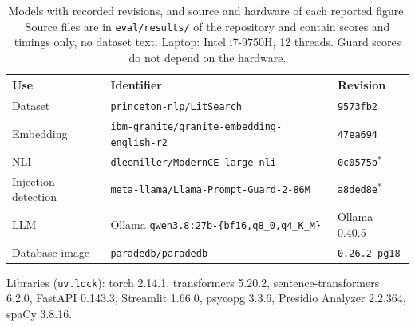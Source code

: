 \begin{table}[ht]
\centering
\caption{Models with recorded revisions, and source and hardware of each reported figure. Source files are in \texttt{eval/results/} of the repository and contain scores and timings only, no dataset text. Laptop: Intel i7-9750H, 12 threads. Guard scores do not depend on the hardware.}
\label{tab:provenance}
\small
\begin{tabular}{lll}
\toprule
Use & Identifier & Revision \\
\midrule
Dataset & \texttt{princeton-nlp/LitSearch} & \texttt{9573fb2} \\
Embedding & \texttt{ibm-granite/granite-embedding-english-r2} & \texttt{47ea694} \\
NLI & \texttt{dleemiller/ModernCE-large-nli} & \texttt{0c0575b}$^{*}$ \\
Injection detection & \texttt{meta-llama/Llama-Prompt-Guard-2-86M} & \texttt{a8ded8e}$^{*}$ \\
LLM & Ollama \texttt{qwen3.8:27b-\{bf16,q8\_0,q4\_K\_M\}} & Ollama 0.40.5 \\
Database image & \texttt{paradedb/paradedb} & \texttt{0.26.2-pg18} \\
\bottomrule
\end{tabular}

\smallskip
{\footnotesize Libraries (\texttt{uv.lock}): torch 2.14.1, transformers 5.20.2, sentence-transformers 6.2.0, FastAPI 0.143.3, Streamlit 1.66.0, psycopg 3.3.6, Presidio Analyzer 2.2.364, spaCy 3.8.16.}


\end{table}
